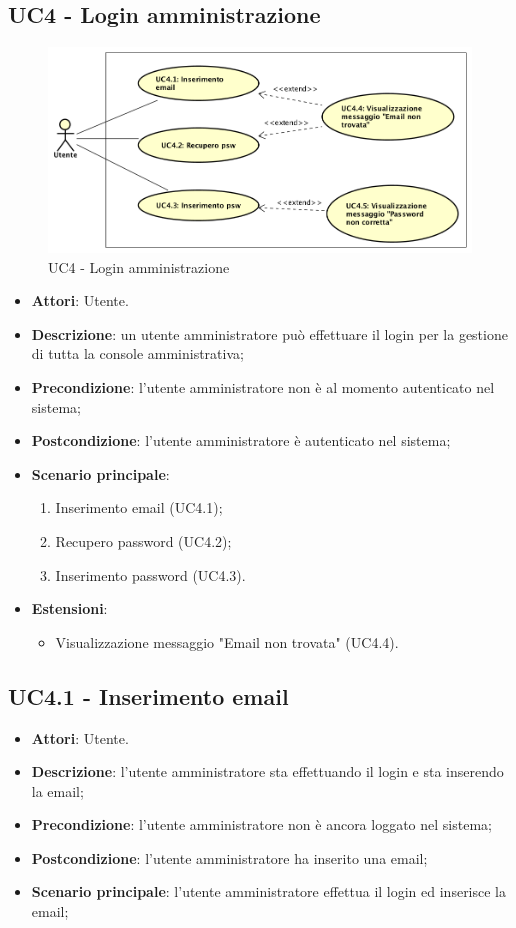 \documentclass[../AnalisiDeiRequisiti_v4.0.0.tex]{subfiles}
\begin{document}
\subsection{UC4 - Login amministrazione} 
\label{sssec:UC4} 
\begin{figure}[!h]
	\centering
	\includegraphics[width=\textwidth]{UseCases/UC4_LoginAmministrazione/UC4_LoginAmministrazione.png}
	\caption{UC4 - Login amministrazione}
\end{figure}
\begin{itemize} 
\item \textbf{Attori}: Utente.
\item \textbf{Descrizione}: un utente amministratore può effettuare il login per la gestione di tutta la console amministrativa;
\item \textbf{Precondizione}: l'utente amministratore non è al momento autenticato nel sistema;
\item \textbf{Postcondizione}: l'utente amministratore è autenticato nel sistema;
\item \textbf{Scenario principale}: \begin{enumerate}\item Inserimento email (UC4.1);\item Recupero password (UC4.2);\item Inserimento password (UC4.3). 
 \end{enumerate}
\item \textbf{Estensioni}:\begin{itemize}\item Visualizzazione messaggio "Email non trovata" (UC4.4).\end{itemize}
\end{itemize} 
\subsection{UC4.1 - Inserimento email} 
\label{sssec:UC4.1} 
\begin{itemize} 
\item \textbf{Attori}: Utente.
\item \textbf{Descrizione}: l'utente amministratore sta effettuando il login e sta inserendo la email;
\item \textbf{Precondizione}: l'utente amministratore non è ancora loggato nel sistema;
\item \textbf{Postcondizione}: l'utente amministratore ha inserito una email;
\item \textbf{Scenario principale}: l'utente amministratore effettua il login ed inserisce la email;
\end{itemize} 
\end{document}
